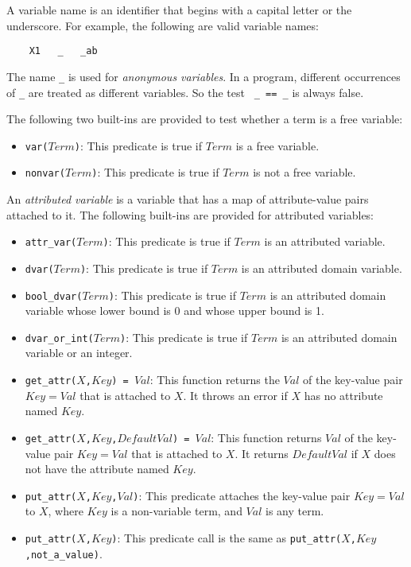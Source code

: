A variable name is an identifier that begins with a capital letter or the underscore. For example, the following are valid variable names:
\begin{verbatim}
    X1   _   _ab
\end{verbatim}
The name \verb+_+ is used for \emph{anonymous variables}. In a program, different occurrences of \verb+_+ are treated as different variables. So the test \verb+ _ == _+ is always false.

The following two built-ins are provided to test whether a term is a free variable:
\begin{itemize}
\item \texttt{var($Term$)}: This predicate is true if $Term$ is a free variable.
\item \texttt{nonvar($Term$)}: This predicate is true if $Term$ is not a free variable.
\end{itemize}

An \emph{attributed variable} is a variable that has a map of attribute-value pairs attached to it. The following built-ins are provided for attributed variables:

\begin{itemize}
\item \texttt{attr\_var($Term$)}: This predicate is true if $Term$ is an attributed variable.
\item \texttt{dvar($Term$)}: This predicate is true if $Term$ is an attributed domain variable.
\item \texttt{bool\_dvar($Term$)}: This predicate is true if $Term$ is an attributed domain variable whose lower bound is 0 and whose upper bound is 1.
\item \texttt{dvar\_or\_int($Term$)}: This predicate is true if $Term$ is an attributed domain variable or an integer.
\item \texttt{get\_attr($X$,$Key$) = $Val$}: This function returns the \texttt{$Val$} of the key-value pair \texttt{$Key$$=$$Val$} that is attached to \texttt{$X$}. It throws an error if \texttt{$X$} has no attribute named $Key$.
\item \texttt{get\_attr($X$,$Key$,$DefaultVal$) = $Val$}: This function returns \texttt{$Val$} of the key-value pair \texttt{$Key$$=$$Val$} that is attached to \texttt{$X$}. It returns $DefaultVal$ if $X$ does not have the attribute named $Key$.
\item \texttt{put\_attr($X$,$Key$,$Val$)}: This predicate attaches the key-value pair \texttt{$Key$$=$$Val$} to \texttt{$X$}, where \texttt{$Key$} is a non-variable term, and \texttt{$Val$} is any term. 
\item \texttt{put\_attr($X$,$Key$)}: This predicate call is the same as \texttt{put\_attr($X$,$Key$,not\_a\_value)}.
\end{itemize}

